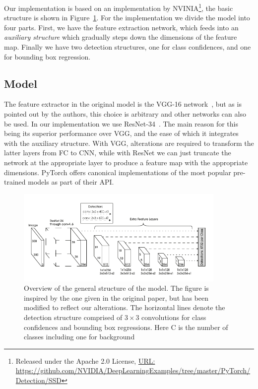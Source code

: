 Our implementation is based on an implementation by NVINIA\footnote{Released under the Apache 2.0 License, \href{https://github.com/NVIDIA/DeepLearningExamples/tree/master/PyTorch/Detection/SSD}{URL:\\ } \url{https://github.com/NVIDIA/DeepLearningExamples/tree/master/PyTorch/Detection/SSD}}, the basic structure is shown in Figure~\ref{fig:model}.
For the implementation we divide the model into four parts.
First, we have the feature extraction network, which feeds into an \textit{auxiliary structure} which gradually steps down the dimensions of the feature map.
Finally we have two detection structures, one for class confidences, and one for bounding box regression.

\subsection{Model}
The feature extractor in the original model is the VGG-16 network~\parencite{simonyan2015deep}, but as is pointed out by the authors, this choice is arbitrary and other networks can also be used.
In our implementation we use ResNet-34~\parencite{he2015deep}.
The main reason for this being its superior performance over VGG, and the ease of which it integrates with the auxiliary structure.
With VGG, alterations are required to transform the latter layers from FC to CNN, while with ResNet we can just truncate the network at the appropriate layer to produce a feature map with the appropriate dimensions.
PyTorch offers canonical implementations of the most popular pre-trained models as part of their API\@.

\begin{figure}[htb]
  \centering
  \includegraphics[width=0.9\textwidth]{figs/model.pdf}
  \caption[Model architecture overview]{Overview of the general structure of the model. The figure is inspired by the one given in the original paper, but has been modified to reflect our alterations.
The horizontal lines denote the detection structure comprised of \(3\times 3\) convolutions for class confidences and bounding box regressions.
Here \textsf{C} is the number of classes including one for background}\label{fig:model}
\end{figure}

